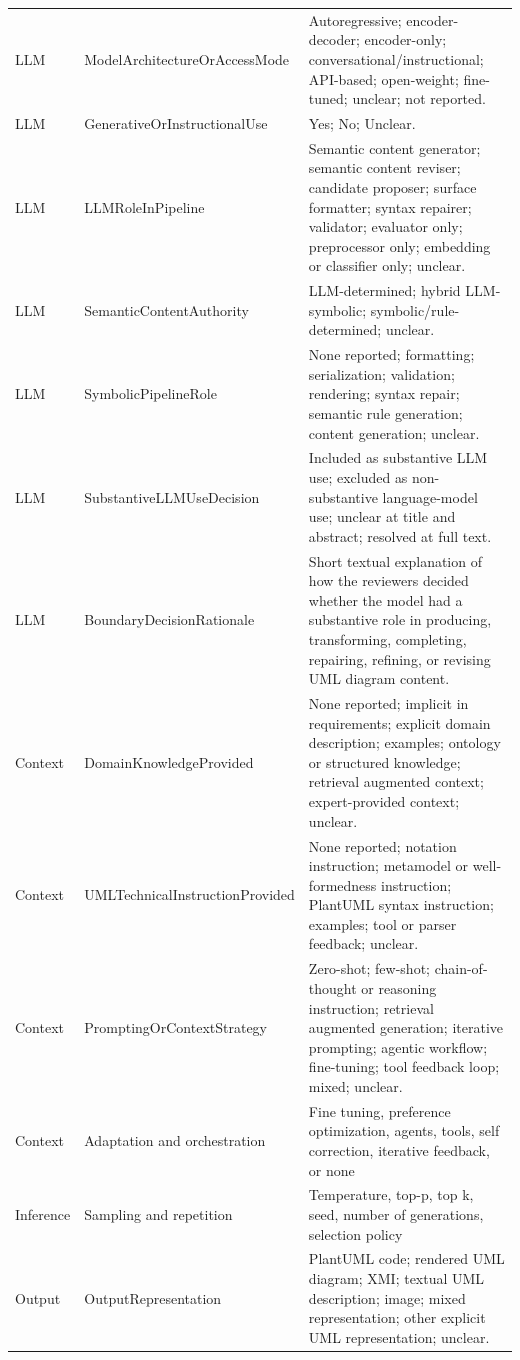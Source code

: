 \begin{longtable}{p{} p{} p{}}
LLM & ModelArchitectureOrAccessMode & Autoregressive; encoder-decoder; encoder-only; conversational/instructional; API-based; open-weight; fine-tuned; unclear; not reported. \\
LLM & GenerativeOrInstructionalUse & Yes; No; Unclear. \\
LLM & LLMRoleInPipeline & Semantic content generator; semantic content reviser; candidate proposer; surface formatter; syntax repairer; validator; evaluator only; preprocessor only; embedding or classifier only; unclear. \\
LLM & SemanticContentAuthority & LLM-determined; hybrid LLM-symbolic; symbolic/rule-determined; unclear. \\
LLM & SymbolicPipelineRole & None reported; formatting; serialization; validation; rendering; syntax repair; semantic rule generation; content generation; unclear. \\
LLM & SubstantiveLLMUseDecision & Included as substantive LLM use; excluded as non-substantive language-model use; unclear at title and abstract; resolved at full text. \\
LLM & BoundaryDecisionRationale & Short textual explanation of how the reviewers decided whether the model had a substantive role in producing, transforming, completing, repairing, refining, or revising UML diagram content. \\
Context & DomainKnowledgeProvided & None reported; implicit in requirements; explicit domain description; examples; ontology or structured knowledge; retrieval augmented context; expert-provided context; unclear. \\
Context & UMLTechnicalInstructionProvided & None reported; notation instruction; metamodel or well-formedness instruction; PlantUML syntax instruction; examples; tool or parser feedback; unclear. \\
Context & PromptingOrContextStrategy & Zero-shot; few-shot; chain-of-thought or reasoning instruction; retrieval augmented generation; iterative prompting; agentic workflow; fine-tuning; tool feedback loop; mixed; unclear. \\
Context & Adaptation and orchestration & Fine tuning, preference optimization, agents, tools, self correction, iterative feedback, or none \\
Inference & Sampling and repetition & Temperature, top-p, top k, seed, number of generations, selection policy \\
Output & OutputRepresentation & PlantUML code; rendered UML diagram; XMI; textual UML description; image; mixed representation; other explicit UML representation; unclear. \\

\end{longtable}
